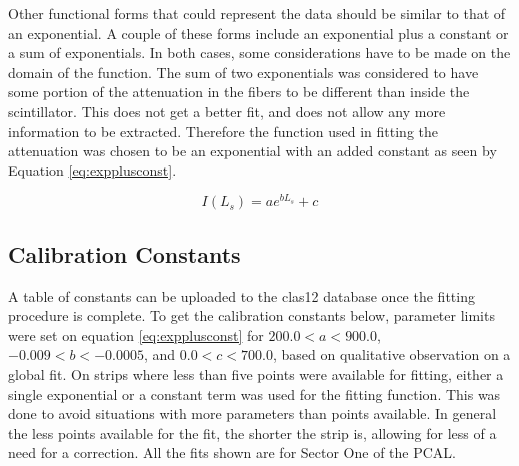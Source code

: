 \begin{comment}
\begin{equation}
    I(L_{s})= ae^{(b_{1} + b_{2})L_{s} + b_{1}L_{f}}
    \label{eq:try1mid}
\end{equation}

\FloatBarrier
\begin{figure}[h]
    \centering
    \texttt{[image: exponential67eq9]}
    \caption{Plotted is the fit of equation \ref{eq:try1mid} as a function of $L_{s}$.}
    \label{fig:try1mid}
\end{figure}
\end{comment}
\FloatBarrier


Other functional forms that could represent the data should be similar to that of an exponential.
A couple of these forms include an exponential plus a constant or a sum of exponentials.
In both cases, some considerations have to be made on the domain of the function.
The sum of two exponentials was considered to have some portion of the attenuation in the fibers to be different than inside the scintillator. This does not get a better fit, and does not allow any more information to be extracted. Therefore the function used in fitting the attenuation was chosen to be an exponential with an added constant as seen by Equation \ref{eq:expplusconst}.

\begin{equation}
    I(L_{s}) = ae^{bL_{s}}+c
    \label{eq:expplusconst}
\end{equation}


\FloatBarrier
\subsection{Calibration Constants}
A table of constants can be uploaded to the clas12 database once the fitting procedure is complete.
To get the calibration constants below, parameter limits were set on equation \ref{eq:expplusconst} for $200.0 < a < 900.0$, $-0.009 < b < -0.0005$, and $0.0 < c < 700.0$, based on qualitative observation on a global fit. On strips where less than five points were available for fitting, either a single exponential or a constant term was used for the fitting function. This was done to avoid situations with more parameters than points available. In general the less points available for the fit, the shorter the strip is, allowing for less of a need for a correction. All the fits shown are for Sector One of the PCAL.
\FloatBarrier
\vspace{5mm}

